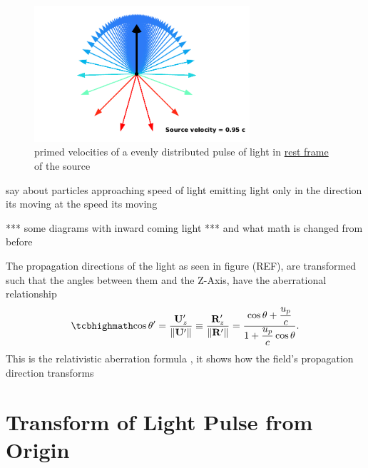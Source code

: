 \begin{figure}[ht]
	\centering
	\includegraphics[width=8cm]{images/pdf/Aberrated_velocities.pdf}
	\caption{primed velocities of a evenly distributed pulse of light in \protect\hyperlink{def-proper-frame}{rest frame} of the source}
\end{figure}

say about particles approaching speed of light emitting light only in the direction its moving at the speed its moving

*** some diagrams with inward coming light ***
and what math is changed from before



The propagation directions of the light as seen in figure (REF), are transformed such that the angles between them and the Z-Axis, have the aberrational relationship
\begin{equation}%
	\label{Cosine transform}
	\mhl{
	\cos\theta' = \frac{\mathbf{U}'_z}{\|\mathbf{U}'\|} \equiv \frac{\mathbf{R}'_{z}}{\|\mathbf{R}'\|} =  \dfrac{\cos\theta + \dfrac{u_p}{c}}{1+\dfrac{u_p}{c}\cos\theta}.
	}
\end{equation}%
This is the relativistic aberration formula \cite{einstein1905electrodynamics}, it shows how the field's propagation direction transforms


\section{Transform of Light Pulse from Origin}

